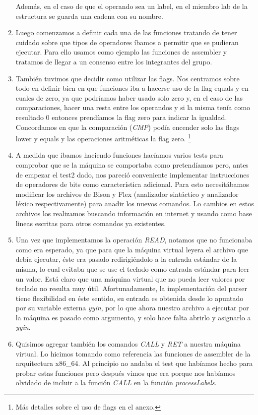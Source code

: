 \documentclass[a4paper,12pt]{article}
\begin{document}
\begin{enumerate}
Adem\'as, en el caso de que el operando sea un label, en el miembro lab de la estructura se guarda una cadena con su nombre. 
\item
Luego comenzamos a definir cada una de las funciones tratando de tener cuidado sobre que tipos de operadores \'ibamos a permitir que se pudieran ejecutar. Para ello usamos como ejemplo las funciones de assembler y tratamos de llegar a un consenso entre los integrantes del grupo.
\item
Tambi\'en tuvimos que decidir como utilizar las flags. Nos centramos sobre todo en definir bien en que funciones iba a hacerse uso de la flag equals y en cuales de zero, ya que podr\'iamos haber usado solo zero y, en el caso de las comparaciones, hacer una resta entre los operandos y si la misma ten\'ia como resultado 0 entonces prend\'iamos la flag zero para indicar la igualdad. Concordamos en que la comparaci\'on (\emph{CMP}) pod\'ia encender solo las flags lower y equals y las operaciones aritm\'eticas la flag zero. 
\footnote{M\'as detalles sobre el uso de flags en el anexo.}
\item 
A medida que \'ibamos haciendo funciones hac\'iamos varios tests para comprobar que se la m\'aquina se comportaba como pretend\'iamos pero, antes de empezar el test2 dado, nos pareci\'o conveniente implementar instrucciones de operadores de bits como caracter\'istica adicional. Para esto necesit\'abamos modificar los archivos de Bison y Flex (analizador sint\'actico y analizador l\'exico respectivamente) para anadir los nuevos comandos. Lo cambios en estos archivos los realizamos buscando informaci\'on en internet y usando como base lineas escritas para otros comandos ya existentes.
\item
Una vez que implementamos la operaci\'on \emph{READ}, notamos que no funcionaba como era esperado, ya que para que la m\'aquina virtual leyera el archivo que deb\'ia ejecutar, \'este era pasado redirigi\'endolo a la entrada est\'andar de la misma, lo cual evitaba que se use el teclado como entrada est\'andar para leer un valor.
Est\'a claro que una m\'aquina virtual que no pueda leer valores por teclado no resulta muy \'util. Afortunadamente, la implementaci\'on del parser tiene flexibilidad en \'este sentido, su entrada es obtenida desde lo apuntado por su variable externa \emph{yyin}, por lo que ahora nuestro archivo a ejecutar por la m\'aquina es pasado como argumento, y solo hace falta abrirlo y asignarlo a \emph{yyin}.
\item
Quisimos agregar tambi\'en los comandos \emph{CALL} y \emph{RET} a nuestra m\'aquina virtual. Lo hicimos tomando como referencia las funciones de assembler de la arquitectura x86\_64. Al principio no andaba el test que hab\'iamos hecho para probar estas funciones pero despu\'es vimos que era porque nos hab\'iamos olvidado de incluir a la funci\'on \emph{CALL} en la funci\'on \emph{processLabels}. 
\end{enumerate}
\end{document}
